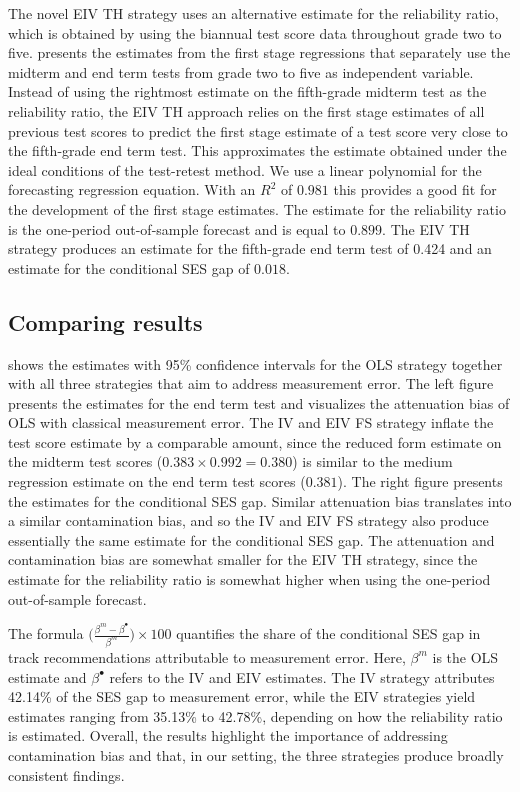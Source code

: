 The novel EIV TH strategy uses an alternative estimate for the reliability ratio, which is obtained by using the biannual test score data throughout grade two to five.  presents the estimates from the first stage regressions that separately use the midterm and end term tests from grade two to five as independent variable. Instead of using the rightmost estimate on the fifth-grade midterm test as the reliability ratio, the EIV TH approach relies on the first stage estimates of all previous test scores to predict the first stage estimate of a test score  very close to the fifth-grade end term test. This approximates the estimate obtained under the ideal conditions of the test-retest method. We use a linear polynomial for the forecasting regression equation. With an $R^2$ of $0.981$ this provides a good fit for the development of the first stage estimates. The estimate for the reliability ratio is the one-period out-of-sample forecast and is equal to $0.899$. The EIV TH strategy produces an estimate for the fifth-grade end term test of 0.424 and an estimate for the conditional SES gap of $0.018$. 

\subsection{Comparing results}



 shows the estimates with 95\% confidence intervals for the OLS strategy together with all three strategies that aim to address measurement error. The left figure presents the estimates for the end term test and visualizes the attenuation bias of OLS with classical measurement error. The IV and EIV FS strategy inflate the test score estimate by a comparable amount, since the reduced form estimate on the midterm test scores ($0.383\times 0.992=0.380$) is similar to the medium regression estimate on the end term test scores ($0.381$). The right figure presents the estimates for the conditional SES gap. Similar attenuation bias translates into a similar contamination bias, and so the IV and EIV FS strategy also produce essentially the same estimate for the conditional SES gap. The attenuation and contamination bias are somewhat smaller for the EIV TH strategy, since the estimate for the reliability ratio is somewhat higher when using the one-period out-of-sample forecast.

The formula  $\Bigg(\frac{\beta^m-\beta^{\bullet}}{\beta^m} \Bigg) \times 100$ quantifies the share of the conditional SES gap in track recommendations attributable to measurement error. Here, $\beta^m$ is the OLS estimate and $\beta^{\bullet}$ refers to the IV and EIV estimates. The IV strategy attributes 42.14\% of the SES gap to measurement error, while the EIV strategies yield estimates ranging from 35.13\% to 42.78\%, depending on how the reliability ratio is estimated. Overall, the results highlight the importance of addressing contamination bias and that, in our setting, the three strategies produce broadly consistent findings.

